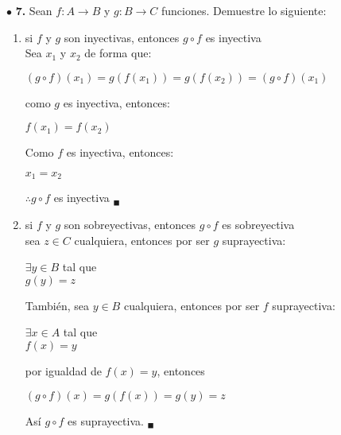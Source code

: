 \documentclass[12pt]{article}
\begin{document}
\vspace{0.5cm}
%
%
$\bullet$ \textbf{7.} Sean ${\displaystyle f: A \longrightarrow B}$ y ${\displaystyle g: B \longrightarrow C}$ funciones. Demuestre lo siguiente:
\begin{enumerate}[label=\alph*)]
    \item si ${\displaystyle f}$ y ${\displaystyle g}$ son inyectivas, entonces ${\displaystyle g \circ f}$ es inyectiva\\

    Sea $x_1$ y $x_2$ de forma que:

    \begin{center}
        $(g \circ f) (x_1) = g(f(x_1)) = g(f(x_2)) = (g \circ f) (x_1)$\\
    \end{center}
    como $g$ es inyectiva, entonces:

    \begin{center}
        $f(x_1) = f(x_2)$\\
    \end{center}
    Como $f$ es inyectiva, entonces:

    \begin{center}
        $x_1 = x_2$\\
    \end{center}
    $\therefore g \circ f$ es inyectiva $_\blacksquare$\\

    \item si ${\displaystyle f}$ y ${\displaystyle g}$ son sobreyectivas, entonces ${\displaystyle g \circ f}$ es sobreyectiva\\

    sea $z \in C$ cualquiera, entonces por ser $g$ suprayectiva:
    \begin{center}
        $\exists y \in B$ tal que\\

        $g(y) = z$
    \end{center}
    También, sea $y \in B$ cualquiera, entonces por ser $f$ suprayectiva:
    \begin{center}
        $\exists x \in A$ tal que\\

        $f(x) = y$
    \end{center}

    por igualdad de $f(x) = y$, entonces 
    \begin{center}
        $(g \circ f) (x) = g(f(x)) = g(y) = z$
    \end{center}
    Así $g \circ f$ es suprayectiva. $_\blacksquare$\\


\end{enumerate}
\end{document}
